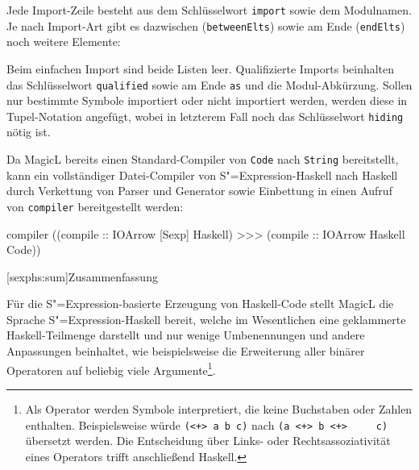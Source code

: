 \documentclass[11pt, a4paper, bibgerm]{scrbook}
\newenvironment{DIFnomarkup}{}{}
\newcommand\icode[1]{\lstinline?#1?}
\newcommand\lsection{}
\newcommand{\sexp}{S"=Expression}
\begin{document}
Jede Import-Zeile besteht aus dem Schlüsselwort \icode{import} sowie
dem Modulnamen. Je nach Import-Art gibt es dazwischen
(\icode{betweenElts}) sowie am Ende (\icode{endElts}) noch
weitere Elemente:
\begin{DIFnomarkup}\end{DIFnomarkup}%
Beim einfachen Import sind beide Listen leer. Qualifizierte Imports
beinhalten das Schlüsselwort \icode{qualified} sowie am Ende
\icode{as} und die Modul-Abkürzung. Sollen nur bestimmte Symbole
importiert oder nicht importiert werden, werden diese in
Tupel-Notation angefügt, wobei in letzterem Fall noch das
Schlüsselwort \icode{hiding} nötig ist.

Da MagicL bereits einen Standard-Compiler von \icode{Code} nach
\icode{String} bereitstellt, kann ein vollständiger Datei-Compiler von
\sexp{}-Haskell nach Haskell durch Verkettung von Parser
und Generator sowie Einbettung in einen Aufruf von \icode{compiler}
bereitgestellt werden:
\begin{DIFnomarkup}\begin{code}
compiler ((compile :: IOArrow [Sexp] Haskell) >>> 
          (compile :: IOArrow Haskell Code))  
\end{code}\end{DIFnomarkup}

\lsection[sexphs:sum]{Zusammenfassung}

Für die \sexp{}-basierte Erzeugung von Haskell-Code stellt MagicL die
Sprache \sexp{}-Haskell bereit, welche im Wesentlichen eine geklammerte
Haskell-Teilmenge darstellt und nur wenige Umbenennungen und andere
Anpassungen beinhaltet, wie beispielsweise die Erweiterung aller binärer
Operatoren auf beliebig viele Argumente\footnote{Als Operator werden
  Symbole interpretiert, die keine Buchstaben oder Zahlen
  enthalten. Beispielsweise würde \icode{(<+> a b c)} nach \icode{(a <+> b <+>
    c)} übersetzt werden. Die Entscheidung über Links- oder
  Rechtsassoziativität eines Operators trifft anschließend Haskell.}.
\end{document}
